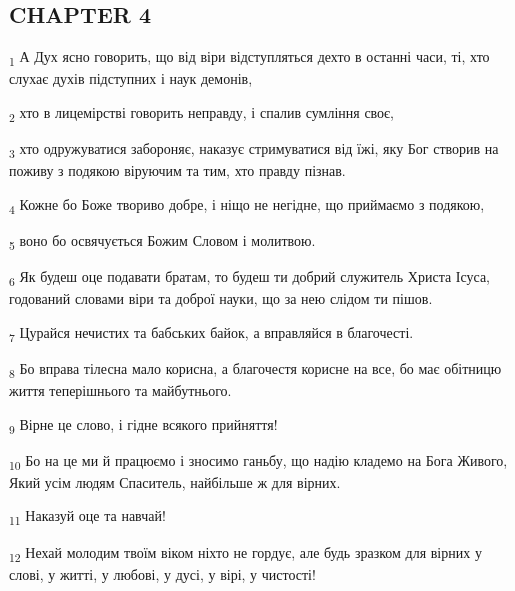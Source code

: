 \subsection{CHAPTER 4}
\begin{tcolorbox}
\textsubscript{1} А Дух ясно говорить, що від віри відступляться дехто в останні часи, ті, хто слухає духів підступних і наук демонів,
\end{tcolorbox}
\begin{tcolorbox}
\textsubscript{2} хто в лицемірстві говорить неправду, і спалив сумління своє,
\end{tcolorbox}
\begin{tcolorbox}
\textsubscript{3} хто одружуватися забороняє, наказує стримуватися від їжі, яку Бог створив на поживу з подякою віруючим та тим, хто правду пізнав.
\end{tcolorbox}
\begin{tcolorbox}
\textsubscript{4} Кожне бо Боже твориво добре, і ніщо не негідне, що приймаємо з подякою,
\end{tcolorbox}
\begin{tcolorbox}
\textsubscript{5} воно бо освячується Божим Словом і молитвою.
\end{tcolorbox}
\begin{tcolorbox}
\textsubscript{6} Як будеш оце подавати братам, то будеш ти добрий служитель Христа Ісуса, годований словами віри та доброї науки, що за нею слідом ти пішов.
\end{tcolorbox}
\begin{tcolorbox}
\textsubscript{7} Цурайся нечистих та бабських байок, а вправляйся в благочесті.
\end{tcolorbox}
\begin{tcolorbox}
\textsubscript{8} Бо вправа тілесна мало корисна, а благочестя корисне на все, бо має обітницю життя теперішнього та майбутнього.
\end{tcolorbox}
\begin{tcolorbox}
\textsubscript{9} Вірне це слово, і гідне всякого прийняття!
\end{tcolorbox}
\begin{tcolorbox}
\textsubscript{10} Бо на це ми й працюємо і зносимо ганьбу, що надію кладемо на Бога Живого, Який усім людям Спаситель, найбільше ж для вірних.
\end{tcolorbox}
\begin{tcolorbox}
\textsubscript{11} Наказуй оце та навчай!
\end{tcolorbox}
\begin{tcolorbox}
\textsubscript{12} Нехай молодим твоїм віком ніхто не гордує, але будь зразком для вірних у слові, у житті, у любові, у дусі, у вірі, у чистості!
\end{tcolorbox}
